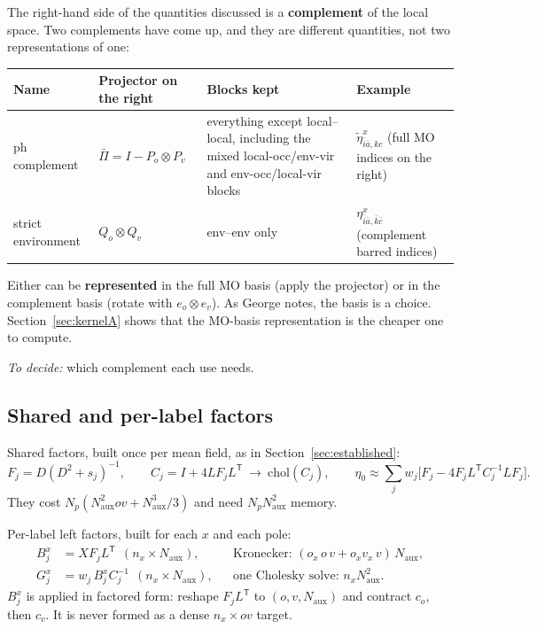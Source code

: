 \documentclass[11pt,a4paper]{article}
\newcommand{\Naux}{N_{\mathrm{aux}}}
\newcommand{\Np}{N_{p}}
\newcommand{\ov}{ov}
\begin{document}
The right-hand side of the quantities discussed is a \textbf{complement} of the local space.
Two complements have come up, and they are different quantities, not two representations of
one:

\begin{center}
\small
\begin{tabularx}{\textwidth}{@{}>{\raggedright\arraybackslash}p{2.3cm}>{\raggedright\arraybackslash}p{3.0cm}L>{\raggedright\arraybackslash}p{3.3cm}@{}}
\toprule
Name & Projector on the right & Blocks kept & Example \\
\midrule
ph complement & $\bar\Pi = I - P_o\otimes P_v$
  & everything except local--local, including the mixed local-occ/env-vir and env-occ/local-vir blocks
  & $\tilde\eta^x_{\bar i\bar a,kc}$ (full MO indices on the right) \\
strict environment & $Q_o\otimes Q_v$ & env--env only
  & $\eta^x_{\bar i\bar a,\bar k\bar c}$ (complement barred indices) \\
\bottomrule
\end{tabularx}
\end{center}

Either can be \textbf{represented} in the full MO basis (apply the projector) or in the
complement basis (rotate with $e_o\otimes e_v$). As George notes, the basis is a choice.
Section~\ref{sec:kernelA} shows that the MO-basis representation is the cheaper one to
compute.

\noindent\emph{To decide:} which complement each use needs.

\subsection{Shared and per-label factors}

Shared factors, built once per mean field, as in Section~\ref{sec:established}:
\begin{equation}
  F_j = D(D^2+s_j)^{-1},\qquad C_j = I+4LF_jL^{\mathsf T}\ \to\ \mathrm{chol}(C_j),\qquad
  \eta_0 \approx \sum_j w_j\big[F_j - 4F_jL^{\mathsf T}C_j^{-1}LF_j\big].
\end{equation}
They cost $\Np(\Naux^2\ov+\Naux^3/3)$ and need $\Np\Naux^2$ memory.

Per-label left factors, built for each $x$ and each pole:
\begin{align}
  B_j^x &= XF_jL^{\mathsf T}\ \ (n_x\times\Naux), &&\text{Kronecker: } (o_x\,o\,v + o_xv_x\,v)\,\Naux,\\
  G_j^x &= w_j\,B_j^xC_j^{-1}\ \ (n_x\times\Naux), &&\text{one Cholesky solve: } n_x\Naux^2 .
\end{align}
$B_j^x$ is applied in factored form: reshape $F_jL^{\mathsf T}$ to $(o,v,\Naux)$ and contract
$c_o$, then $c_v$. It is never formed as a dense $n_x\times\ov$ target.
\end{document}
